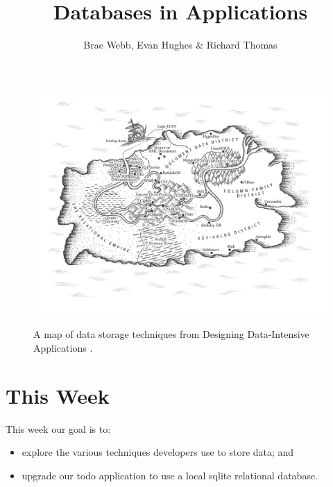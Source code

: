 \documentclass{csse4400}
\title{Databases in Applications}
\author{Brae Webb, Evan Hughes \& Richard Thomas}
\date{\week[practical]{2}}
\begin{document}
\maketitle

\begin{figure}[h]
  \href{https://www.oreilly.com/library/view/designing-data-intensive-applications/9781491903063/ch02.html}{
    \includegraphics[width=\textwidth]{images/databases}
  }
\caption{A map of data storage techniques from Designing Data-Intensive Applications \cite{data-intensive}.}
\end{figure}



\section{This Week}
This week our goal is to:
\begin{itemize}
  \item explore the various techniques developers use to store data; and
  \item upgrade our todo application to use a local sqlite relational database.
\end{itemize}

\clearpage
\end{document}
